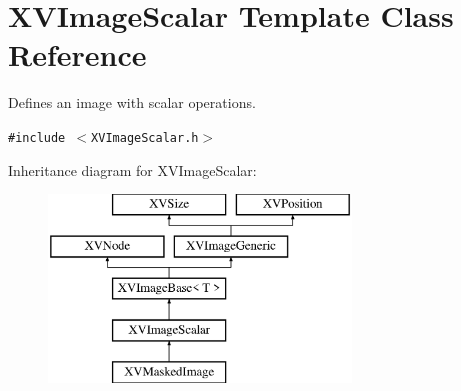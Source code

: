 \hypertarget{class_XVImageScalar}{
\section{XVImage\-Scalar  Template Class Reference}
\label{XVImageScalar}
}
Defines an image with scalar operations. 


{\tt \#include $<$XVImage\-Scalar.h$>$}

Inheritance diagram for XVImage\-Scalar:\begin{figure}[H]
\begin{center}
\leavevmode
\includegraphics[height=5cm]{class_XVImageScalar}
\end{center}
\end{figure}
